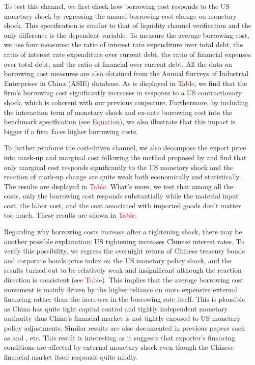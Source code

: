 To test this channel, we first check how borrowing cost responds to the US monetary shock by regressing the annual borrowing cost change on monetary shock. This specification is similar to that of liquidity channel verification and the only difference is the dependent variable. To measure the average borrowing cost, we use four measures: the ratio of interest rate expenditure over total debt, the ratio of interest rate expenditure over current debt, the ratio of financial expenses over total debt, and the ratio of financial over current debt. All the data on borrowing cost measures are also obtained from the Annual Surveys of Industrial Enterprises in China (ASIE) database. As is displayed in \textcolor{red}{Table}, we find that the firm's borrowing cost significantly increases in response to a US contractionary shock, which is coherent with our previous conjecture. Furthermore, by including the interaction term of monetary shock and ex-ante borrowing cost into the benchmark specification (see \textcolor{red}{Equation}), we also illustrate that this impact is bigger if a firm faces higher borrowing costs.


To further reinforce the cost-driven channel, we also decompose the export price into mark-up and marginal cost following the method proposed by \cite{deloecker2012markups} and find that only marginal cost responds significantly to the US monetary shock and the reaction of mark-up change are quite weak both economically and statistically. The results are displayed in \textcolor{red}{Table}. What's more, we test that among all the costs, only the borrowing cost responds substantially while the material input cost, the labor cost, and the cost associated with imported goods don't matter too much. These results are shown in \textcolor{red}{Table}.

Regarding why borrowing costs increase after a tightening shock, there may be another possible explanation: US tightening increases Chinese interest rates. To verify this possibility, we regress the overnight return of Chinese treasury bonds and corporate bonds price index on the US monetary policy shock, and the results turned out to be relatively weak and insignificant although the reaction direction is consistent (see \textcolor{red}{Table}). This implies that the average borrowing cost movement is mainly driven by the higher reliance on more expensive external financing rather than the increases in the borrowing rate itself. This is plausible as China has quite tight capital control and tightly independent monetary authority thus China's financial market is not tightly exposed to US monetary policy adjustments. Similar results are also documented in previous papers such as \cite{hausman2011global} and \cite{ho2018hot}, etc. This result is interesting as it suggests that exporter's financing conditions are affected by external monetary shock even though the Chinese financial market itself responds quite mildly.


